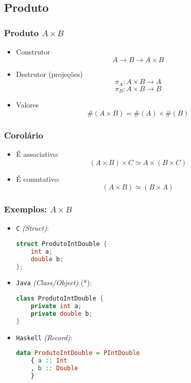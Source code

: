 \documentclass{beamer}
\newcommand{\lang}[1]{\texttt{#1}}
\newcommand{\typetam}{\#}
\newcommand{\typesim}{\simeq}
\begin{document}
\subsection{Produto}
\begin{frame}
    \frametitle{Produto \(A \times B\)}
    \begin{itemize}
        \item Construtor
            \[
                A \to B \to A \times B
            \]
            \vfill
        \item Destrutor (projeções)
            \[
                \pi_A : A \times B \to A
            \] \[
                \pi_B : A \times B \to B
            \]
            \vfill
        \item Valores
            \[
                \typetam(A \times B) = \typetam(A) \times \typetam(B)
            \]
    \end{itemize}
\end{frame}

\begin{frame}
    \frametitle{Corolário}
    \begin{itemize}
        \item É associativo:
            \[
                (A \times B) \times C \typesim A \times (B \times C)
            \]
            \vfill
        \item É comutativo:
            \[
                (A \times B) \typesim (B \times A)
            \]
    \end{itemize}
\end{frame}

\begin{frame}[fragile]
    \frametitle{Exemplos: \(A \times B\)}
    \begin{itemize}
        \item \lang{C} \emph{(Struct)}:
            \begin{lstlisting}[language=C]
struct ProdutoIntDouble {
    int a;
    double b;
};
            \end{lstlisting}
        \item \lang{Java} \emph{(Class/Object)} (*):
            \begin{lstlisting}[language=Java]
class ProdutoIntDouble {
    private int a;
    private double b;
}
            \end{lstlisting}
        \item \lang{Haskell} \emph{(Record)}:
            \begin{lstlisting}[language=Haskell]
data ProdutoIntDouble = PIntDouble
    { a :: Int
    , b :: Double
    }
            \end{lstlisting}
    \end{itemize}
\end{frame}
\end{document}
